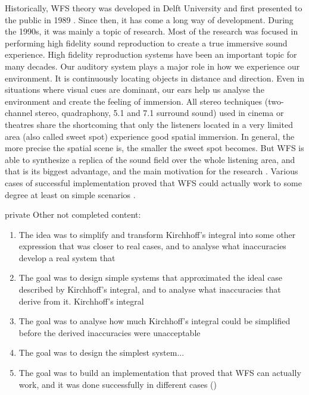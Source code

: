 Historically, WFS theory was developed in Delft University and first presented to the public in 1989 \cite{berkhout1989acoustic}. Since then, it has come a long way of development. During the 1990s, it was mainly a topic of research. Most of the research was focused in performing high fidelity sound reproduction to create a true immersive sound experience. 
High fidelity reproduction systems have been an important topic for many decades. Our auditory system plays a major role in how we experience our environment. It is continuously locating objects in distance and direction. Even in situations where visual cues are dominant, our ears help us analyse the environment and create the feeling of immersion. All stereo techniques (two-channel stereo, quadraphony, 5.1 and 7.1 surround sound) used in cinema or theatres share the shortcoming that only the listeners located in a very limited area (also called sweet spot) experience good spatial immersion. In general, the more precise the spatial scene is, the smaller the sweet spot becomes. But WFS is able to synthesize a replica of the sound field over the whole listening area, and that is its biggest advantage, and the main motivation for the research \cite{Brandenburg2009}.
Various cases of successful implementation proved that WFS could actually work to some degree at least on simple scenarios \cite{Start1997,Verheijen,Vogel}.

\begin{shownto}{private}
	Other not completed content:
	\begin{enumerate}
		\item The idea was to simplify and transform Kirchhoff's integral into some other expression that was closer to real cases, and to analyse what inaccuracies  develop a real system that
		\item The goal was to design simple systems that approximated the ideal case described by Kirchhoff's integral, and to analyse what inaccuracies that derive from it. Kirchhoff's integral 
		\item The goal was to analyse how much Kirchhoff's integral could be simplified before the derived inaccuracies were unacceptable
		\item The goal was to design the simplest system...
		\item The goal was to build an implementation that proved that WFS can actually work, and it was done successfully in different cases (\cite{Start1997}\cite{Verheijen}\cite{Vogel})
	\end{enumerate}
\end{shownto}


